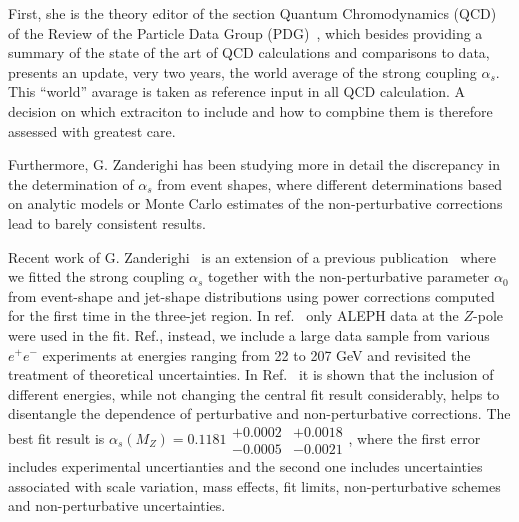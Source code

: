 \documentclass{FBR_Bericht_2025}
\begin{document}
\begin{refsection}
First, she is the theory editor of the section Quantum Chromodynamics
(QCD) of the Review of the Particle Data Group
(PDG)~\cite{ParticleDataGroup:2022pth,ParticleDataGroup:2024cfk},
which besides providing a summary of the state of the art of QCD
calculations and comparisons to data, presents an update, very two
years, the world average of the strong coupling $\alpha_s$. This
``world'' avarage is taken as reference input in all QCD
calculation. A decision on which extraciton to include and how to
compbine them is therefore assessed with greatest care.

Furthermore, G. Zanderighi has been studying more in detail the
discrepancy in the determination of $\alpha_s$ from event shapes,
where different determinations based on analytic models or Monte Carlo
estimates of the non-perturbative corrections lead to barely
consistent results.

Recent work of G. Zanderighi~\cite{Nason:2025qbx} is an extension of a previous
publication~\cite{Nason:2023asn} where we fitted the strong coupling
$\alpha_s$ together with the non-perturbative parameter $\alpha_0$ from
event-shape and jet-shape distributions using power corrections
computed for the first time in the three-jet region.
%
In ref.~\cite{Nason:2023asn} only ALEPH data at the $Z$-pole were
used in the fit. Ref., instead, we include a large data sample from
various $e^+e^-$ experiments at energies ranging from 22 to 207
GeV and revisited the treatment of theoretical uncertainties.
%
In Ref.~\cite{Nason:2025qbx} it is shown that the inclusion of different
energies, while not changing the central fit result considerably,
helps to disentangle the dependence of perturbative and
non-perturbative corrections.
%
The best fit result is $\alpha_s(M_Z) = 0.1181 \substack{ +0.0002
  \\ -0.0005} \substack{ +0.0018 \\ -0.0021}$, where the first error
includes experimental uncertianties and the second one includes
uncertainties associated with scale variation, mass effects, fit
limits, non-perturbative schemes and non-perturbative uncertainties.





\end{refsection}
\end{document}
